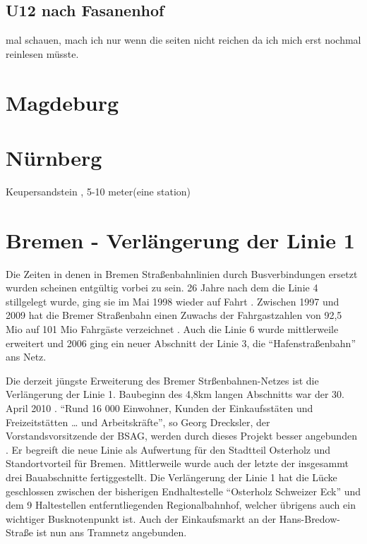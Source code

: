 \subsection*{U12 nach Fasanenhof}

mal schauen, mach ich nur wenn die seiten nicht reichen da ich mich erst nochmal reinlesen müsste.


\section{Magdeburg}


\section{Nürnberg}

Keupersandstein , 5-10 meter(eine station) \cite{nbRef3} 

\section[Bremen]{Bremen - Verlängerung der Linie 1}

Die Zeiten in denen in Bremen Straßenbahnlinien durch Busverbindungen ersetzt wurden scheinen entgültig vorbei zu sein. 26 Jahre nach dem die Linie 4 stillgelegt wurde, ging sie im Mai 1998 wieder auf Fahrt \cite{bSv11}. Zwischen 1997 und 2009 hat die Bremer Straßenbahn einen Zuwachs der Fahrgastzahlen von 92,5 Mio auf 101 Mio Fahrgäste verzeichnet \cite{bNp10}. Auch die Linie 6 wurde mittlerweile erweitert und 2006 ging ein neuer Abschnitt der Linie 3, die ``Hafenstraßenbahn'' ans Netz. 

Die derzeit jüngste Erweiterung des Bremer Strßenbahnen-Netzes ist die Verlängerung der Linie 1. Baubeginn des 4,8km langen Abschnitts war der 30. April 2010 \cite{bNp10}. ``Rund 16 000 Einwohner, Kunden der Einkaufsstäten und Freizeitstätten {…} und Arbeitskräfte'', so Georg Drecksler, der Vorstandsvorsitzende der BSAG, werden durch dieses Projekt besser angebunden \cite{bNp10}. Er begreift die neue Linie als Aufwertung für den Stadtteil Osterholz und Standortvorteil für Bremen. Mittlerweile wurde auch der letzte der insgesammt drei Bauabschnitte\cite{bSv12} fertiggestellt. Die Verlängerung der Linie 1 hat die Lücke geschlossen zwischen der bisherigen Endhaltestelle ``Osterholz Schweizer Eck'' und dem 9 Haltestellen entferntliegenden Regionalbahnhof, welcher übrigens auch ein wichtiger Busknotenpunkt ist. Auch der Einkaufsmarkt an der Hans-Bredow-Straße ist nun ans Tramnetz angebunden.

